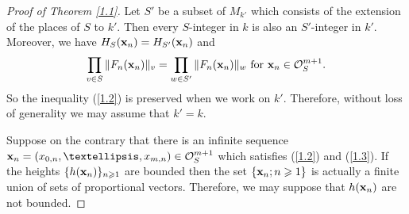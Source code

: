 \documentclass[10pt,a4paper]{amsart}
\begin{document}
\begin{proof}[Proof of Theorem \ref{1.1}]
Let $S'$ be a subset of $M_{k'}$ which consists of the extension of the places of $S$ to $k'$. Then every $S$-integer in $k$ is also an $S'$-integer in $k'$. Moreover, we have $H_{S}({\bf x}_{n})=H_{S'}({\bf x}_{n})$ and
$$\prod_{v \in S}\|F_{n}({\bf x}_{n})\|_{v}=\prod_{w \in S'}\|F_{n}({\bf x}_{n})\|_{w} \text { for } {\bf x}_{n} \in \mathcal{O}_{S}^{m+1}.$$
So the inequality (\ref{1.2}) is preserved when we work on $k'$. Therefore, without loss of generality we may assume that $k'=k$. 

Suppose on the contrary that there is an infinite sequence ${\bf x}_{n}=(x_{0, n}, \ldots, x_{m,n}) \in \mathcal{O}_{S}^{m+1}$ which satisfies (\ref{1.2}) and (\ref{1.3}). If the heights $\{h({\bf x}_{n})\}_{n\geqslant 1}$ are bounded then the set $\{{\bf x}_{n};n\geqslant 1\}$ is actually a finite union of sets of proportional vectors. Therefore, we may suppose that $h({\bf x}_{n})$ are not bounded. 


\end{proof}
\end{document}
